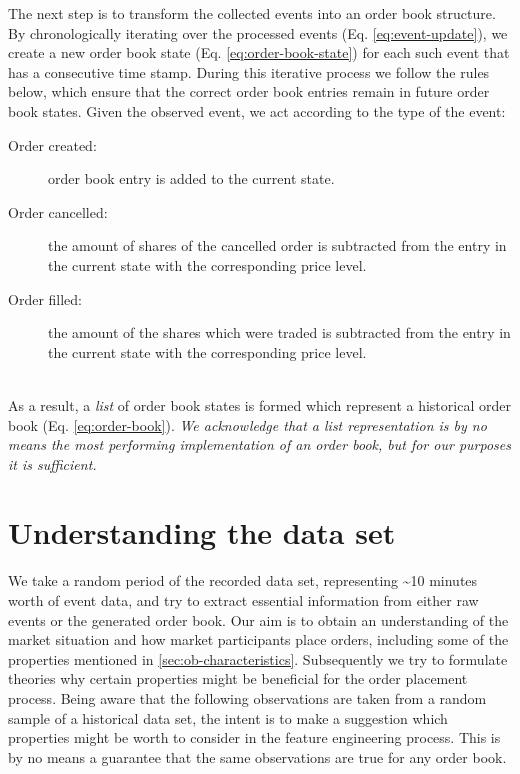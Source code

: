 The next step is to transform the collected events into an order book structure.
By chronologically iterating over the processed events (Eq. \ref{eq:event-update}), we create a new order book state (Eq. \ref{eq:order-book-state}) for each such event that has a consecutive time stamp.
During this iterative process we follow the rules below, which ensure that the correct order book entries remain in future order book states.
Given the observed event, we act according to the type of the event:
\begin{description}
    \item[Order created:] order book entry is added to the current state.
    \item[Order cancelled:] the amount of shares of the cancelled order is subtracted from the entry in the current state with the corresponding price level.
    \item[Order filled:] the amount of the shares which were traded is subtracted from the entry in the current state with the corresponding price level.
\end{description}
\hfill
\\
As a result, a \textit{list} of order book states is formed which represent a historical order book (Eq. \ref{eq:order-book}).
\textit{We acknowledge that a list representation is by no means the most performing implementation of an order book, but for our purposes it is sufficient.}

\vfill

\section{Understanding the data set}

We take a random period of the recorded data set, representing \textasciitilde10 minutes worth of event data, and try to extract essential information from either raw events or the generated order book.
Our aim is to obtain an understanding of the market situation and how market participants place orders, including some of the properties mentioned in \ref{sec:ob-characteristics}.
Subsequently we try to formulate theories why certain properties might be beneficial for the order placement process.
Being aware that the following observations are taken from a random sample of a historical data set, the intent is to make a suggestion which properties might be worth to consider in the feature engineering process.
This is by no means a guarantee that the same observations are true for any order book.


